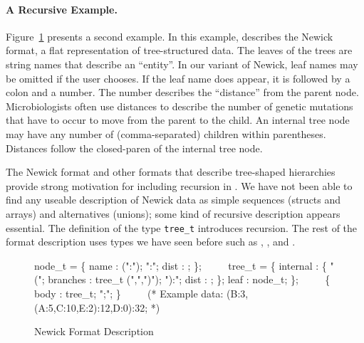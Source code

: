 \paragraph*{A Recursive \ipads{} Example.}
Figure~\ref{fig:ipads-newick} presents a second \ipads{} example.
In this example, \ipads{} describes the Newick format, a flat
representation of tree-structured data.  The leaves of the trees
are string names that describe an ``entity''.   In our variant of Newick, 
leaf names may be omitted if the user chooses.  If the leaf name does appear,
it is followed by a colon and a number.  The number describes the ``distance''
from the parent node.  Microbiologists often use
distances to describe the
number of genetic mutations that have to occur to move from the parent 
to the child.  An internal tree node may have any number of (comma-separated)
children within parentheses.  Distances follow the closed-paren
of the internal tree node.

The Newick format and other formats that describe tree-shaped 
hierarchies~\cite{geneontology,newick}
provide strong motivation for including recursion in \ipads.  
We have not been able to find any useable description of Newick data as
simple sequences (structs and arrays) and alternatives (unions); some
kind of recursive description appears essential.
The definition of the type {\tt tree\_t} introduces recursion.
The rest of the format description uses types we have seen before such as
\Pstruct, \Parray{}, and \Punion.


\begin{figure}

\begin{code}
node\_t = \Popt \Pstruct \{
                name : \Pstring(":"); ":";
                dist : \Puint;  
              \};
\(\qquad\)
\Prec tree\_t =
  \Punion \{
    internal : 
      \Pstruct \{
        "(";
        branches : tree\_t \Parray(",",")");
        "):";
        dist : \Puint;
      \};
    leaf : node\_t;
  \};
\(\qquad\)
\Pstruct \{
  body : tree\_t;
  ";";
\}
\(\qquad\)
(* Example data:
   (B:3,(A:5,C:10,E:2):12,D:0):32;
*)

\end{code}
\caption{\ipads{} Newick Format Description}
\label{fig:ipads-newick}

\end{figure}

